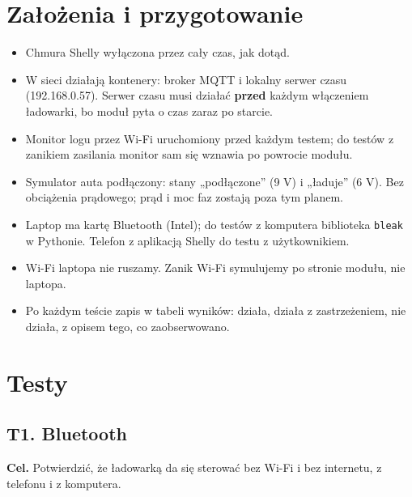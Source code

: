\documentclass[11pt,a4paper]{article}
\begin{document}
\section{Założenia i przygotowanie}

\begin{itemize}
\item Chmura Shelly wyłączona przez cały czas, jak dotąd.
\item W sieci działają kontenery: broker MQTT i lokalny serwer czasu (192.168.0.57). Serwer czasu musi działać \textbf{przed} każdym włączeniem ładowarki, bo moduł pyta o czas zaraz po starcie.
\item Monitor logu przez Wi-Fi uruchomiony przed każdym testem; do testów z zanikiem zasilania monitor sam się wznawia po powrocie modułu.
\item Symulator auta podłączony: stany „podłączone” (9 V) i „ładuje” (6 V). Bez obciążenia prądowego; prąd i moc faz zostają poza tym planem.
\item Laptop ma kartę Bluetooth (Intel); do testów z komputera biblioteka \texttt{bleak} w Pythonie. Telefon z aplikacją Shelly do testu z użytkownikiem.
\item Wi-Fi laptopa nie ruszamy. Zanik Wi-Fi symulujemy po stronie modułu, nie laptopa.
\item Po każdym teście zapis w tabeli wyników:  działa,  działa z zastrzeżeniem,  nie działa, z opisem tego, co zaobserwowano.
\end{itemize}

\section{Testy}

\subsection{T1. Bluetooth}

\textbf{Cel.} Potwierdzić, że ładowarką da się sterować bez Wi-Fi i bez internetu, z telefonu i z komputera.
\end{document}
